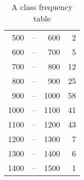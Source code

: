 \begin{table}[H]
  \centering
  \begin{tabular}{rrrr}
    500  & -- & 600  & 2  \\
    600  & -- & 700  & 5  \\
    700  & -- & 800  & 12 \\
    800  & -- & 900  & 25 \\
    900  & -- & 1000 & 58 \\
    1000 & -- & 1100 & 41 \\
    1100 & -- & 1200 & 43 \\
    1200 & -- & 1300 & 7  \\
    1300 & -- & 1400 & 6  \\
    1400 & -- & 1500 & 1  \\
    \bottomrule
  \end{tabular}
  \caption{A class frequency table}
  \label{tbl:class-frequency-table}
\end{table}

